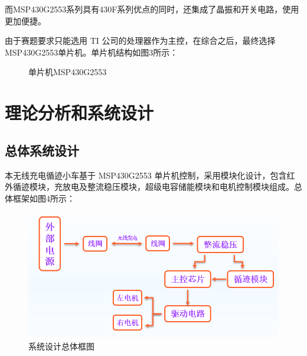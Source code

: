 \documentclass[UTF8]{ctexart}
\begin{document}
而MSP430G2553系列具有430F系列优点的同时，还集成了晶振和开关电路，使用更加便捷。

由于赛题要求只能选用 TI 公司的处理器作为主控，在综合之后，最终选择 MSP430G2553单片机。单片机结构如图3所示：
\begin{figure}[H]   
	\centering	  
	\label{}\hfill	  
	\label{}
	\caption{单片机MSP430G2553}	  
	\label{fig3} 
\end{figure}


\section{理论分析和系统设计}

\subsection{总体系统设计}
本无线充电循迹小车基于 MSP430G2553 单片机控制，采用模块化设计，包含红外循迹模块，充放电及整流稳压模块，超级电容储能模块和电机控制模块组成。总体框架如图4所示：
\begin{figure}[H]   
	\centering	        \includegraphics[width=0.7\linewidth]{F4.png}
	\caption{系统设计总体框图}	  
	\label{fig4} 
\end{figure}
\end{document}

